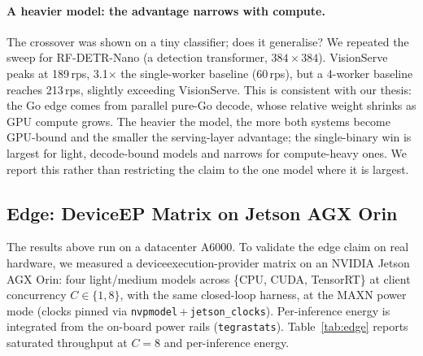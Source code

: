 \paragraph{A heavier model: the advantage narrows with compute.}
The crossover was shown on a tiny classifier; does it generalise?  We repeated the sweep for
RF-DETR-Nano (a detection transformer, $384{\times}384$).  VisionServe peaks at 189\,rps,
3.1$\times$ the single-worker baseline (60\,rps), but a 4-worker baseline reaches
213\,rps, slightly exceeding VisionServe.  This is consistent with our thesis: the Go edge
comes from parallel pure-Go decode, whose relative weight shrinks as GPU compute
grows.  The heavier the model, the more both systems become GPU-bound and the smaller the
serving-layer advantage; the single-binary win is largest for light, decode-bound models and
narrows for compute-heavy ones.  We report this rather than restricting the claim to the one model
where it is largest.

\subsection{Edge: Device\texttimes EP Matrix on Jetson AGX Orin}
\label{sec:eval:edge}

The results above run on a datacenter A6000.  To validate the edge claim on real hardware, we
measured a device\texttimes execution-provider matrix on an NVIDIA Jetson AGX Orin: four
light/medium models across \{CPU, CUDA, TensorRT\} at client concurrency $C\in\{1,8\}$, with the
same closed-loop harness, at the MAXN power mode (clocks pinned via
\texttt{nvpmodel}\,+\,\texttt{jetson\_clocks}).  Per-inference energy is integrated from the
on-board power rails (\texttt{tegrastats}).  Table~\ref{tab:edge} reports saturated throughput at
$C{=}8$ and per-inference energy.

